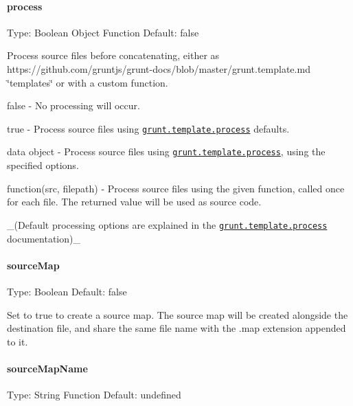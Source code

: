 \paragraph*{process}

Type\+: {\ttfamily Boolean} {\ttfamily Object} {\ttfamily Function} Default\+: {\ttfamily false}

Process source files before concatenating, either as https\+://github.com/gruntjs/grunt-\/docs/blob/master/grunt.\+template.\+md \char`\"{}templates\char`\"{} or with a custom function.


\begin{DoxyItemize}
\item {\ttfamily false} -\/ No processing will occur.
\item {\ttfamily true} -\/ Process source files using \href{https://github.com/gruntjs/grunt-docs/blob/master/grunt.template.md#grunttemplateprocess}{\tt grunt.\+template.\+process} defaults.
\item {\ttfamily data} object -\/ Process source files using \href{https://github.com/gruntjs/grunt-docs/blob/master/grunt.template.md#grunttemplateprocess}{\tt grunt.\+template.\+process}, using the specified options.
\item {\ttfamily function(src, filepath)} -\/ Process source files using the given function, called once for each file. The returned value will be used as source code.
\end{DoxyItemize}

\+\_\+(Default processing options are explained in the \href{https://github.com/gruntjs/grunt-docs/blob/master/grunt.template.md#grunttemplateprocess}{\tt grunt.\+template.\+process} documentation)\+\_\+

\paragraph*{source\+Map}

Type\+: {\ttfamily Boolean} Default\+: {\ttfamily false}

Set to true to create a source map. The source map will be created alongside the destination file, and share the same file name with the {\ttfamily .map} extension appended to it.

\paragraph*{source\+Map\+Name}

Type\+: {\ttfamily String} {\ttfamily Function} Default\+: {\ttfamily undefined}

